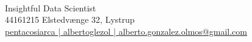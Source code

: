 
\author{\textcolor{\primaryColorToUse}{Alberto 
 }\textcolor{\secondaryColorToUse}{ 
 Gonz\'alez Olmos}} %
\def\phone{ 44161215 }
\def\city{ Elstedvænge 32, Lystrup}
\def\github{ pentacosiarca | } %
\def\LinkedIn{ albertoglezol | } %
\def\email{alberto.gonzalez.olmos@gmail.com}
\def\role{Insightful Data Scientist} %


\begin{center}
	\begin{minipage}[b]{1\textwidth}
	\makeatletter
	\centering {\huge \@author} \\
	\makeatother
    \vspace{1.5em}
    {\Large{\role}} \\
	\vspace{1em}
	{\faMobile*}{\phone}%
	{\faMapMarker*}{\small \city} \\ %
	\href{https://github.com/\github}{\faGithub \github}%
	\href{https://www.linkedin.com/in/\LinkedIn}{\faLinkedin   \LinkedIn} %
	\href{mailto:\email}{ \email}  %
	\end{minipage}
\end{center}


